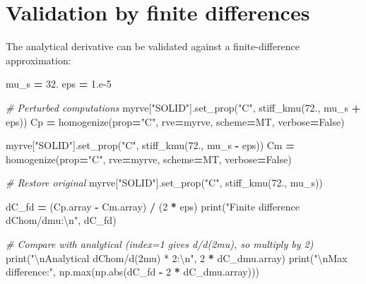 \documentclass[
  a4paper,
  numbers=noendperiod,
  DIV=12]{scrreprt}
\newenvironment{Shaded}{\begin{snugshade}}{\end{snugshade}}
\newcommand{\BuiltInTok}[1]{#1}
\newcommand{\CharTok}[1]{\textcolor[rgb]{0.31,0.60,0.02}{#1}}
\newcommand{\CommentTok}[1]{\textcolor[rgb]{0.56,0.35,0.01}{\textit{#1}}}
\newcommand{\DecValTok}[1]{\textcolor[rgb]{0.00,0.00,0.81}{#1}}
\newcommand{\FloatTok}[1]{\textcolor[rgb]{0.00,0.00,0.81}{#1}}
\newcommand{\NormalTok}[1]{#1}
\newcommand{\OperatorTok}[1]{\textcolor[rgb]{0.81,0.36,0.00}{\textbf{#1}}}
\newcommand{\StringTok}[1]{\textcolor[rgb]{0.31,0.60,0.02}{#1}}
\newcommand{\VariableTok}[1]{\textcolor[rgb]{0.00,0.00,0.00}{#1}}
\begin{document}
\section{Validation by finite
differences}\label{validation-by-finite-differences}

The analytical derivative can be validated against a finite-difference
approximation:

\begin{Shaded}
\begin{Highlighting}[]
\NormalTok{mu\_s }\OperatorTok{=} \FloatTok{32.}
\NormalTok{eps }\OperatorTok{=} \FloatTok{1.e{-}5}

\CommentTok{\# Perturbed computations}
\NormalTok{myrve[}\StringTok{"SOLID"}\NormalTok{].set\_prop(}\StringTok{"C"}\NormalTok{, stiff\_kmu(}\FloatTok{72.}\NormalTok{, mu\_s }\OperatorTok{+}\NormalTok{ eps))}
\NormalTok{Cp }\OperatorTok{=}\NormalTok{ homogenize(prop}\OperatorTok{=}\StringTok{"C"}\NormalTok{, rve}\OperatorTok{=}\NormalTok{myrve, scheme}\OperatorTok{=}\NormalTok{MT, verbose}\OperatorTok{=}\VariableTok{False}\NormalTok{)}

\NormalTok{myrve[}\StringTok{"SOLID"}\NormalTok{].set\_prop(}\StringTok{"C"}\NormalTok{, stiff\_kmu(}\FloatTok{72.}\NormalTok{, mu\_s }\OperatorTok{{-}}\NormalTok{ eps))}
\NormalTok{Cm }\OperatorTok{=}\NormalTok{ homogenize(prop}\OperatorTok{=}\StringTok{"C"}\NormalTok{, rve}\OperatorTok{=}\NormalTok{myrve, scheme}\OperatorTok{=}\NormalTok{MT, verbose}\OperatorTok{=}\VariableTok{False}\NormalTok{)}

\CommentTok{\# Restore original}
\NormalTok{myrve[}\StringTok{"SOLID"}\NormalTok{].set\_prop(}\StringTok{"C"}\NormalTok{, stiff\_kmu(}\FloatTok{72.}\NormalTok{, mu\_s))}

\NormalTok{dC\_fd }\OperatorTok{=}\NormalTok{ (Cp.array }\OperatorTok{{-}}\NormalTok{ Cm.array) }\OperatorTok{/}\NormalTok{ (}\DecValTok{2} \OperatorTok{*}\NormalTok{ eps)}
\BuiltInTok{print}\NormalTok{(}\StringTok{"Finite difference dChom/dmu:}\CharTok{\textbackslash{}n}\StringTok{"}\NormalTok{, dC\_fd)}

\CommentTok{\# Compare with analytical (index=1 gives d/d(2mu), so multiply by 2)}
\BuiltInTok{print}\NormalTok{(}\StringTok{"}\CharTok{\textbackslash{}n}\StringTok{Analytical dChom/d(2mu) * 2:}\CharTok{\textbackslash{}n}\StringTok{"}\NormalTok{, }\DecValTok{2} \OperatorTok{*}\NormalTok{ dC\_dmu.array)}
\BuiltInTok{print}\NormalTok{(}\StringTok{"}\CharTok{\textbackslash{}n}\StringTok{Max difference:"}\NormalTok{, np.}\BuiltInTok{max}\NormalTok{(np.}\BuiltInTok{abs}\NormalTok{(dC\_fd }\OperatorTok{{-}} \DecValTok{2} \OperatorTok{*}\NormalTok{ dC\_dmu.array)))}
\end{Highlighting}
\end{Shaded}
\end{document}
